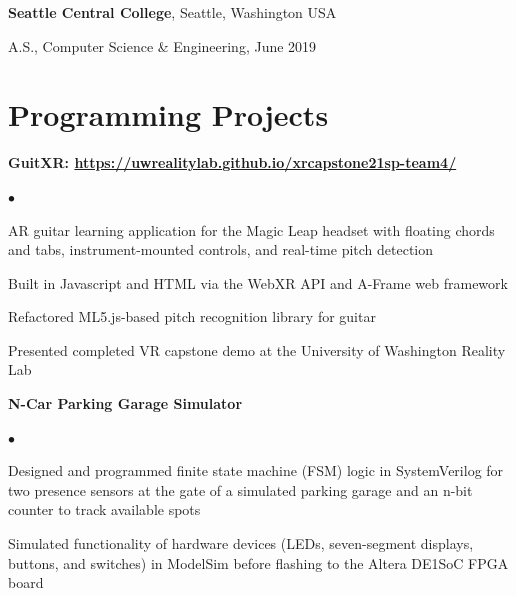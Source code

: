 \documentclass[margin,line]{res}
\newenvironment{list1}{
  \begin{list}{\ding{113}}{%
      \setlength{\itemsep}{0in}
      \setlength{\parsep}{0in} \setlength{\parskip}{0in}
      \setlength{\topsep}{0in} \setlength{\partopsep}{0in} 
      \setlength{\leftmargin}{0.17in}}}{\end{list}}
\newenvironment{list2}{
  \begin{list}{$\bullet$}{%
      \setlength{\itemsep}{0in}
      \setlength{\parsep}{0in} \setlength{\parskip}{0in}
      \setlength{\topsep}{0in} \setlength{\partopsep}{0in} 
      \setlength{\leftmargin}{0.2in}}}{\end{list}}
\begin{document}
\begin{resume}
{\bf Seattle Central College}, Seattle, Washington USA \\ %
\vspace*{-.3cm}
\begin{list1}
\item[] A.S., Computer Science \& Engineering, June 2019
\end{list1}

\vspace{-.2cm}
\section{\sc Programming Projects}


{\bf GuitXR: \url{https://uwrealitylab.github.io/xrcapstone21sp-team4/}} %
\begin{list2}
\item AR guitar learning application for the Magic Leap headset with floating chords and tabs, instrument-mounted controls, and real-time pitch detection
\item Built in Javascript and HTML via the WebXR API and A-Frame web framework
\item Refactored ML5.js-based pitch recognition library for guitar 
\item Presented completed VR capstone demo at the University of Washington Reality Lab
\end{list2}

{\bf N-Car Parking Garage Simulator}
\begin{list2}
\item Designed and programmed finite state machine (FSM) logic in SystemVerilog for two presence sensors at the gate of a simulated parking garage and an n-bit counter to track available spots
\item Simulated functionality of hardware devices (LEDs, seven-segment displays, buttons, and switches) in ModelSim before flashing to the Altera DE1{\textunderscore}SoC FPGA board
\end{list2}



\end{resume}
\end{document}
